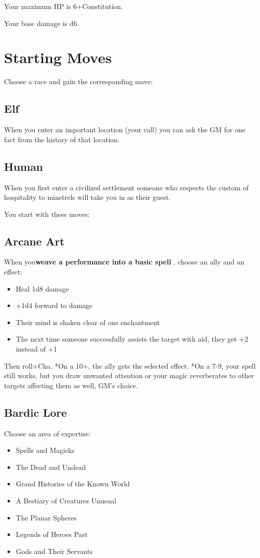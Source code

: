 Your maximum HP is 6+Constitution.


 Your base damage is d6.
\section{Starting Moves}


 Choose a race and gain the corresponding move:
\subsection{Elf}


 When you enter an important location (your call) you can ask the GM for one fact from the history of that location.
\subsection{Human}


 When you first enter a civilized settlement someone who respects the custom of hospitality to minstrels will take you in as their guest.


 You start with these moves:
\subsection{Arcane Art}


 When you\textbf{weave a performance into a basic spell}
, choose an ally and an effect:
\begin{itemize}
\item Heal 1d8 damage
\item +1d4 forward to damage
\item Their mind is shaken clear of one enchantment
\item The next time someone successfully assists the target with aid, they get +2 instead of +1

\end{itemize}


 Then roll+Cha. *On a 10+, the ally gets the selected effect. *On a 7-9, your spell still works, but you draw unwanted attention or your magic reverberates to other targets affecting them as well, GM's choice.
\subsection{Bardic Lore}


 Choose an area of expertise:
\begin{itemize}
\item Spells and Magicks
\item The Dead and Undead
\item Grand Histories of the Known World
\item A Bestiary of Creatures Unusual
\item The Planar Spheres
\item Legends of Heroes Past
\item Gods and Their Servants

\end{itemize}


